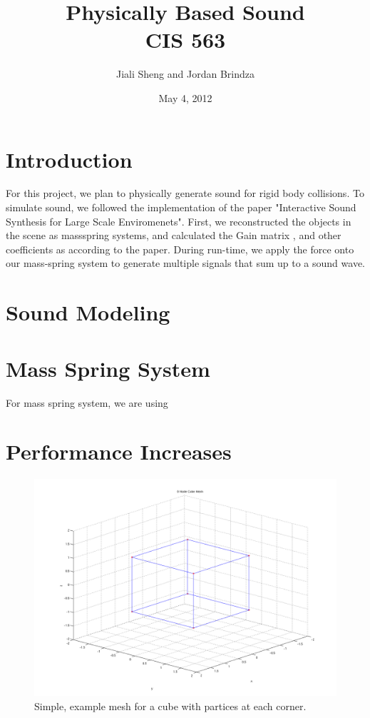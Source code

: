 \documentclass{article}
\begin{document}
\title{Physically Based Sound\\CIS 563}
\date{May 4, 2012}
\author{Jiali Sheng and Jordan Brindza}
\maketitle
  

\section{Introduction}
For this project, we plan to physically generate sound for rigid body collisions. To simulate sound, we followed the implementation of the paper "Interactive Sound Synthesis for Large Scale Enviromenets". First, we reconstructed the objects in the scene as massspring systems, and calculated the Gain matrix , and other coefficients as according to the paper. During run-time, we apply the force onto our mass-spring system to generate multiple signals that sum up to a sound wave. 

\section{Sound Modeling}


\section{Mass Spring System}
For mass spring system, we are using 

\section{Performance Increases}

  \begin{figure}[H]
    \begin{center}
      \includegraphics[width=0.8\columnwidth]{cube_mesh_mesh_plot}
    \end{center} 
    \caption{Simple, example mesh for a cube with partices at each corner.}
  \end{figure}
\end{document}
